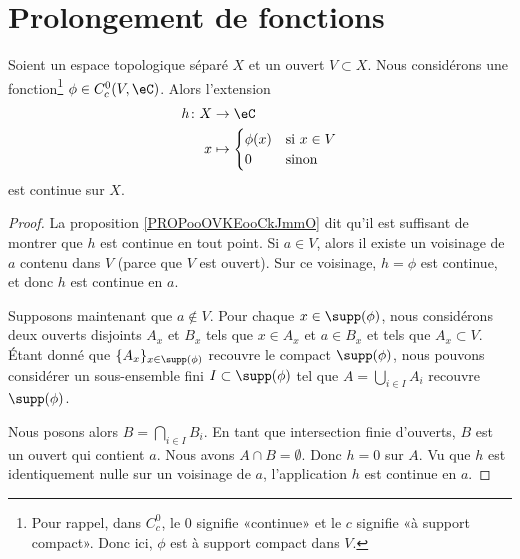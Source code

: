 
\section{Prolongement de fonctions}

\begin{lemma}       \label{LEMooTUQIooEyTLBa}
	Soient un espace topologique séparé \( X\) et un ouvert \( V\subset X\). Nous considérons une fonction\footnote{Pour rappel, dans \( C^0_c\), le \( 0\) signifie «continue» et le \( c\) signifie «à support compact». Donc ici, \( \phi\) est à support compact dans \( V\).} \( \phi\in C^0_c(V,\eC)\). Alors l'extension
	\begin{equation}
		\begin{aligned}
			h\colon X & \to\eC                              \\
			x         & \mapsto \begin{cases}
				                    \phi(x) & \text{si } x\in V \\
				                    0       & \text{sinon }
			                    \end{cases}
		\end{aligned}
	\end{equation}
	est continue sur \( X\).
\end{lemma}

\begin{proof}
	La proposition \ref{PROPooOVKEooCkJmmO} dit qu'il est suffisant de montrer que \( h\) est continue en tout point. Si \( a\in V\), alors il existe un voisinage de \( a\) contenu dans \( V\) (parce que \( V\) est ouvert). Sur ce voisinage, \( h=\phi\) est continue, et donc \( h\) est continue en \( a\).

	Supposons maintenant que \( a\not\in V\). Pour chaque \( x\in\supp(\phi)\), nous considérons deux ouverts disjoints \( A_x\) et \( B_x\) tels que \( x\in A_x\) et \( a\in B_x\) et tels que \( A_x\subset V\). Étant donné que \( \{ A_x \}_{x\in \supp(\phi)} \) recouvre le compact \( \supp(\phi)\), nous pouvons considérer un sous-ensemble fini \( I\subset\supp(\phi)\) tel que \( A=\bigcup_{i\in I}A_i\) recouvre \( \supp(\phi)\).

	Nous posons alors \( B=\bigcap_{i\in I}B_i\). En tant que intersection finie d'ouverts, \( B\) est un ouvert qui contient \( a\). Nous avons \( A\cap B=\emptyset\). Donc \( h=0\) sur \( A\). Vu que \( h\) est identiquement nulle sur un voisinage de \( a\), l'application \( h\) est continue en \( a\).
\end{proof}

